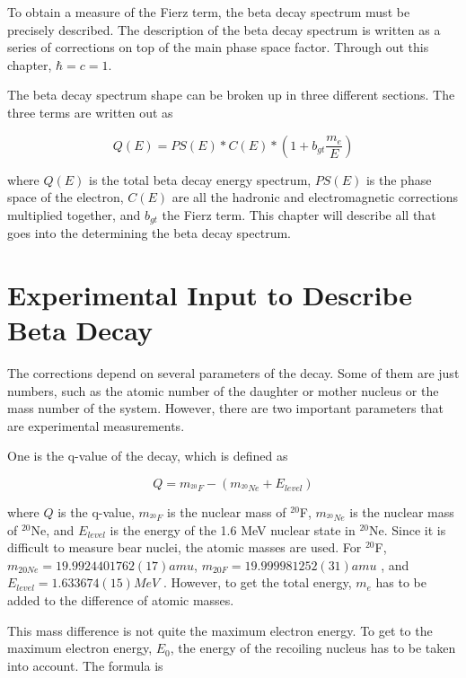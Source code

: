 \documentclass[../MaxHughesThesis.tex]{subfiles}
\begin{document}
To obtain a measure of the Fierz term, the beta decay spectrum must be precisely described.
The description of the beta decay spectrum is written as a series of corrections on top of the main phase space factor.  
Through out this chapter, $\hbar = c = 1$.

The beta decay spectrum shape can be broken up in three different sections.
The three terms are written out as  %

\begin{equation}
	Q(E) = PS(E) * C(E) * (1 + b_{gt}\frac{m_{e}}{E})
	\label{eq:betaspectrum}
\end{equation}

where $Q(E)$ is the total beta decay energy spectrum, $PS(E)$ is the phase space of the electron, $C(E)$ are all the hadronic and electromagnetic corrections multiplied together, and $b_{gt}$ the Fierz term.
This chapter will describe all that goes into the determining the beta decay spectrum.

\section{Experimental Input to Describe Beta Decay}
The corrections depend on several parameters of the decay. 
Some of them are just numbers, such as the atomic number of the daughter or mother nucleus or the mass number of the system.
However, there are two important parameters that are experimental measurements.

One is the q-value of the decay, which is defined as %

\begin{equation}
	Q = m_{^{20}F} - (m_{^{20}Ne} + E_{level})
	\label{eq:qval}
\end{equation} 

where $Q$ is the q-value, $m_{^{20}F}$ is the nuclear mass of $^{20}$F, $m_{^{20}Ne}$ is the nuclear mass of $^{20}$Ne, and $E_{level}$ is the energy of the 1.6 MeV nuclear state in $^{20}$Ne. 
Since it is difficult to measure bear nuclei, the atomic masses are used. 
For $^{20}$F, $m_{20Ne} = 19.9924401762 (17) amu$, $m_{20F} = 19.999981252 (31) amu$ \cite{Wan17} , and $E_{level} = 1.633674 (15) MeV $ \cite{Til98}   .
However, to get the total energy, $m_{e}$ has to be added to the difference of atomic masses. 

This mass difference is not quite the maximum electron energy. 
To get to the maximum electron energy, $E_{0}$, the energy of the recoiling nucleus has to be taken into account.
The formula is %
\end{document}
